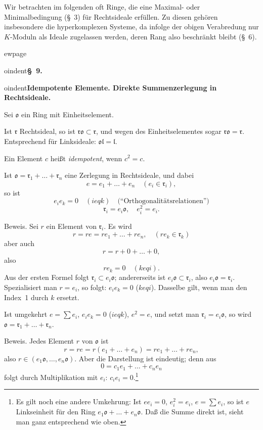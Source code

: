 \documentclass[12pt,a4paper]{article}
\theoremstyle{definition}
\begin{document}
Wir betrachten im folgenden oft Ringe, die eine Maximal- oder
Minimalbedingung (\S~3) f\"ur Rechtsideale erf\"ullen. Zu diesen
geh\"oren insbesondere die hyperkomplexen Systeme, da infolge der
obigen Verabredung nur $K$-Moduln als Ideale zugelassen werden, deren
Rang also beschr\"ankt bleibt (\S~6).



ewpage
\setcounter{page}{594}



oindent\textbf{\S~9.}



oindent\textbf{Idempotente Elemente. Direkte Summenzerlegung in
Rechtsideale.}

Sei $\mathfrak{o}$ ein Ring mit Einheitselement.

Ist $\mathfrak{r}$ Rechtsideal, so ist $\mathfrak{r}\mathfrak{o} \subset
\mathfrak{r}$, und wegen des Einheitselementes sogar
$\mathfrak{r}\mathfrak{o} = \mathfrak{r}$. Entsprechend f\"ur
Linksideale: $\mathfrak{o}\mathfrak{l} = \mathfrak{l}$.

Ein Element $c$ hei\ss t \textit{idempotent}, wenn $c^2 = c$.

Ist $\mathfrak{o} = \mathfrak{r}_1 + \dots + \mathfrak{r}_n$ eine
Zerlegung in Rechtsideale, und dabei
\[
e = e_1 + \dots + e_n \quad (e_i \in \mathfrak{r}_i),
\]
so ist
\[
e_i e_k = 0 \quad (i  eq k) \quad\text{(``Orthogonalit\"atsrelationen'')}
\]
\[
\mathfrak{r}_i = e_i \mathfrak{o}, \quad e_i^2 = e_i.
\]

Beweis. Sei $r$ ein Element von $\mathfrak{r}_i$. Es wird
\[
r = re = re_1 + \dots + re_n, \quad (re_k \in \mathfrak{r}_k)
\]
aber auch
\[
r = r + 0 + \dots + 0,
\]
also
\[
re_k = 0 \quad (k  eq i).
\]
Aus der ersten Formel folgt $\mathfrak{r}_i \subset e_i\mathfrak{o}$;
andererseits ist $e_i\mathfrak{o} \subset \mathfrak{r}_i$, also
$e_i\mathfrak{o} = \mathfrak{r}_i$. Spezialisiert man $r = e_i$, so
folgt: $e_i e_k = 0$ ($k  eq i$). Dasselbe gilt, wenn man den Index~1
durch $k$ ersetzt.

Ist umgekehrt $e = \sum e_i$, $e_i e_k = 0$ ($i  eq k$), $e^2 = e$,
und setzt man $\mathfrak{r}_i = e_i\mathfrak{o}$, so wird
$\mathfrak{o} = \mathfrak{r}_1 + \dots + \mathfrak{r}_n$.

Beweis. Jedes Element $r$ von $\mathfrak{o}$ ist
\[
r = re = r(e_1 + \dots + e_n) = re_1 + \dots + re_n,
\]
also $r \in (e_1\mathfrak{o}, \dots, e_n\mathfrak{o})$. Aber die
Darstellung ist eindeutig; denn aus
\[
0 = c_1 e_1 + \dots + c_n e_n
\]
folgt durch Multiplikation mit $e_i$: $c_i e_i = 0$.\footnote{Es gilt
noch eine andere Umkehrung: Ist $ee_i = 0$, $e_i^2 = e_i$, $e = \sum
 e_i$, so ist $e$ Linkseinheit f\"ur den Ring $e_1\mathfrak{o} + \dots +
e_n\mathfrak{o}$. Da\ss{} die Summe direkt ist, sieht man ganz
entsprechend wie oben.}
\end{document}
